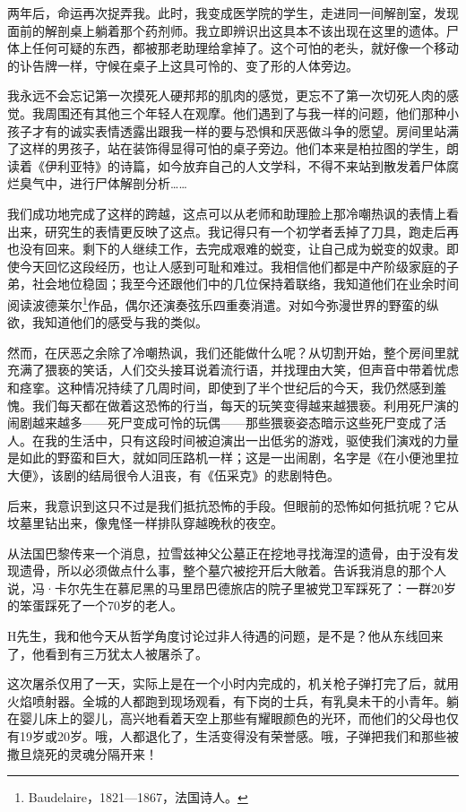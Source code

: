 \documentclass[UTF8]{ctexart}
\begin{document}
两年后，命运再次捉弄我。此时，我变成医学院的学生，走进同一间解剖室，发现面前的解剖桌上躺着那个药剂师。我立即辨识出这具本不该出现在这里的遗体。尸体上任何可疑的东西，都被那老助理给拿掉了。这个可怕的老头，就好像一个移动的讣告牌一样，守候在桌子上这具可怜的、变了形的人体旁边。

我永远不会忘记第一次摸死人硬邦邦的肌肉的感觉，更忘不了第一次切死人肉的感觉。我周围还有其他三个年轻人在观摩。他们遇到了与我一样的问题，他们那种小孩子才有的诚实表情透露出跟我一样的要与恐惧和厌恶做斗争的愿望。房间里站满了这样的男孩子，站在装饰得显得可怕的桌子旁边。他们本来是柏拉图的学生，朗读着《伊利亚特》的诗篇，如今放弃自己的人文学科，不得不来站到散发着尸体腐烂臭气中，进行尸体解剖分析……

我们成功地完成了这样的跨越，这点可以从老师和助理脸上那冷嘲热讽的表情上看出来，研究生的表情更反映了这点。我记得只有一个初学者丢掉了刀具，跑走后再也没有回来。剩下的人继续工作，去完成艰难的蜕变，让自己成为蜕变的奴隶。即使今天回忆这段经历，也让人感到可耻和难过。我相信他们都是中产阶级家庭的子弟，社会地位稳固；我至今还跟他们中的几位保持着联络，我知道他们在业余时间阅读波德莱尔\footnote{Baudelaire，1821—1867，法国诗人。}作品，偶尔还演奏弦乐四重奏消遣。对如今弥漫世界的野蛮的纵欲，我知道他们的感受与我的类似。

然而，在厌恶之余除了冷嘲热讽，我们还能做什么呢？从切割开始，整个房间里就充满了猥亵的笑话，人们交头接耳说着流行语，并找理由大笑，但声音中带着忧虑和痉挛。这种情况持续了几周时间，即使到了半个世纪后的今天，我仍然感到羞愧。我们每天都在做着这恐怖的行当，每天的玩笑变得越来越猥亵。利用死尸演的闹剧越来越多——死尸变成可怜的玩偶——那些猥亵姿态暗示这些死尸变成了活人。在我的生活中，只有这段时间被迫演出一出低劣的游戏，驱使我们演戏的力量是如此的野蛮和巨大，就如同压路机一样；这是一出闹剧，名字是《在小便池里拉大便》，该剧的结局很令人沮丧，有《伍采克》的悲剧特色。

后来，我意识到这只不过是我们抵抗恐怖的手段。但眼前的恐怖如何抵抗呢？它从坟墓里钻出来，像鬼怪一样排队穿越晚秋的夜空。

从法国巴黎传来一个消息，拉雪兹神父公墓正在挖地寻找海涅的遗骨，由于没有发现遗骨，所以必须做点什么事，整个墓穴被挖开后大敞着。告诉我消息的那个人说，冯·卡尔先生在慕尼黑的马里昂巴德旅店的院子里被党卫军踩死了：一群20岁的笨蛋踩死了一个70岁的老人。

H先生，我和他今天从哲学角度讨论过非人待遇的问题，是不是？他从东线回来了，他看到有三万犹太人被屠杀了。

这次屠杀仅用了一天，实际上是在一个小时内完成的，机关枪子弹打完了后，就用火焰喷射器。全城的人都跑到现场观看，有下岗的士兵，有乳臭未干的小青年。躺在婴儿床上的婴儿，高兴地看着天空上那些有耀眼颜色的光环，而他们的父母也仅有19岁或20岁。哦，人都退化了，生活变得没有荣誉感。哦，子弹把我们和那些被撒旦烧死的灵魂分隔开来！
\end{document}
